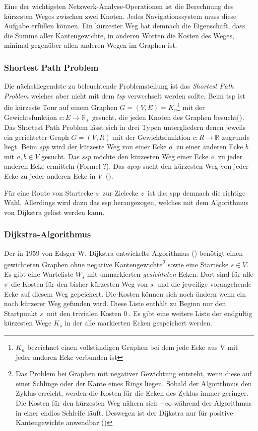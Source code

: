 \documentclass[12pt,a4paper]{article}
\begin{document}
Eine der wichtigsten Netzwerk-Analyse-Operationen ist die Berechnung des kürzesten Weges zwischen zwei Knoten. Jedes Navigationssystem muss diese Aufgabe erfüllen können. Ein kürzester Weg hat demnach die Eigenschaft, dass die Summe aller Kantengewichte, in anderen Worten die Kosten des Weges, minimal gegenüber allen anderen Wegen im Graphen ist.

\subsubsection{Shortest Path Problem}
Die nächstliegendste zu beleuchtende Problemstellung ist das \textit{Shortest Path Problem} welches aber nicht mit dem \textit{\gls{tsp}} verwechselt werden sollte. Beim \gls{tsp} ist die kürzeste Tour auf einem Graphen $G  = (V,E) = K_{n}$\footnote{$K_{n}$ bezeichnet einen vollständigen Graphen bei dem jede Ecke aus V mit jeder anderen Ecke verbunden ist} mit der Gewichtsfunktion $c: E \rightarrow \mathbb{R}_{+}$ gesucht, die jeden Knoten des Graphen besucht(\cite[135]{algorithms}).
Das Shortest Path Problem lässt sich in drei Typen untergliedern denen jeweils ein gerichteter Graph $G = (V,R)$ mit der Gewichtsfunktion $c: R \rightarrow \mathbb{R}$ zugrunde liegt. Beim \textit{\gls{spp}} wird der kürzeste Weg von einer Ecke $a~$ zu einer anderen Ecke $b~$ mit $a,b\in V$ gesucht. Das \textit{\gls{ssp}} möchte den kürzesten Weg einer Ecke $a~$ zu jeder anderen Ecke ermitteln (Formel ?). Das \textit{\gls{apsp}} sucht den kürzesten Weg von jeder Ecke zu jeder anderen Ecke in $V~$ (\cite[169\psq]{algorithms}).

Für eine Route von Startecke $s~$ zur Zielecke $z~$ ist das \gls{spp} demnach die richtige Wahl. Allerdings wird dazu das \gls{ssp} herangezogen, welches mit dem Algorithmus von Dijkstra gelöst werden kann.


\subsubsection{Dijkstra-Algorithmus}
\label{sec:dijkstra}
Der in 1959 von Edsger W. Dijkstra entwickelte Algorithmus (\cite{dijkstra}) benötigt einen gewichteten Graphen ohne negative Kantengewichte\footnote{Das Problem bei Graphen mit negativer Gewichtung entsteht, wenn diese auf einer Schlinge oder der Kante eines Rings liegen. Sobald der Algorithmus den Zyklus erreicht, werden die Kosten für die Ecken des Zyklus immer geringer. Die Kosten für den kürzesten Weg nähern sich $-\infty $ während der Algorithmus in einer endlos Schleife läuft. Deswegen ist der Dijkstra nur für positive Kantengewichte anwendbar (\cite[194\psq]{kurt})} sowie eine Startecke $s \in V$. Es gibt eine Warteliste $W_{s}$ mit unmarkierten \textit{gesichteten} Ecken. Dort sind für alle $v~$ die Kosten für den bisher kürzesten Weg von $s~$ und die jeweilige vorangehende Ecke auf diesem Weg gepeichert. Die Kosten können sich noch ändern wenn ein noch kürzerer Weg gefunden wird. Diese Liste enthält zu Beginn nur den Startpunkt $s~$ mit den trivialen Kosten $0~$. Es gibt eine weitere Liste der endgültig kürzesten Wege $K_{s}$ in der alle markierten Ecken gespeichert werden.
\end{document}
